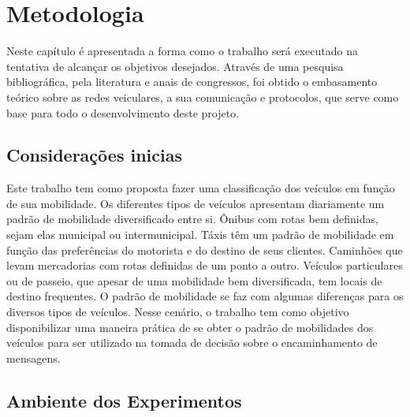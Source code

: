 \documentclass[mestrado, pre-defesa, english, brazil]{packages/icmc}
\begin{document}

\chapter{Metodologia} \label{metodologia}

Neste capítulo é apresentada a forma como o trabalho será executado na tentativa de alcançar os objetivos desejados. Através de uma pesquisa bibliográfica, pela literatura e anais de congressos, foi obtido o embasamento teórico sobre as redes veiculares, a sua comunicação e protocolos, que serve como base para todo o desenvolvimento deste projeto.


\section{Considerações inicias}\label{proposta trabalho}

Este trabalho tem como proposta fazer uma classificação dos veículos em função de sua mobilidade. Os diferentes tipos de veículos apresentam diariamente um padrão de mobilidade diversificado entre si. Ônibus com rotas bem definidas, sejam elas municipal ou intermunicipal. Táxis têm um padrão de mobilidade em função das preferências do motorista e do destino de seus clientes. Caminhões que levam mercadorias com rotas definidas de um ponto a outro. Veículos particulares ou de passeio, que apesar de uma mobilidade bem diversificada, tem locais de destino frequentes. O padrão de mobilidade se faz com algumas diferenças para os diversos tipos de veículos. Nesse cenário, o trabalho tem como objetivo disponibilizar uma maneira prática de se obter o padrão de mobilidades dos veículos para ser utilizado na tomada de decisão sobre o encaminhamento de mensagens.

\section{Ambiente dos Experimentos}
\end{document}
